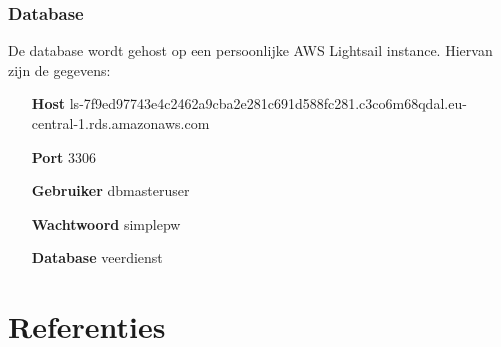 \documentclass{article}
\begin{document}
\subsubsection{Database}
De database wordt gehost op een persoonlijke AWS Lightsail instance.
Hiervan zijn de gegevens:
\begin{itemize}
    \item[\textbf{Host}] ls-7f9ed97743e4c2462a9cba2e281c691d588fc281.c3co6m68qdal.eu-central-1.rds.amazonaws.com
    \item[\textbf{Port}] 3306
    \item[\textbf{Gebruiker}] dbmasteruser
    \item[\textbf{Wachtwoord}] simplepw 
    \item[\textbf{Database}] veerdienst   
\end{itemize}


\section{Referenties}
\printbibliography
\end{document}
